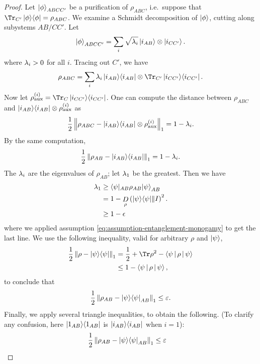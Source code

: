 \begin{appendices}
\begin{proof}
	Let $\ket\phi_{ABCC'}$ be a purification of $\rho_{ABC}$, i.e.\ suppose that $\Tr_{C'} \proj\phi = \rho_{ABC}$. We examine a Schmidt decomposition of $\ket\phi$, cutting along subystems $AB/CC'$. Let
	\begin{equation}
		\ket{\phi}_{ABCC'} = \sum_i \sqrt{\lambda_i} \ket{i_{AB}}\otimes\ket{i_{CC'}}.
	\end{equation}
	where $\lambda_i >0$ for all $i$.
	Tracing out $C'$, we have
	\begin{equation}
		\rho_{ABC} = \sum_i \l_i \proj{i_{AB}}\otimes\Tr_{C'}\proj{i_{CC'}}.
	\end{equation}
	Now let $\rho^{(i)}_{\text{aux}} = \Tr_C\proj{i_{CC'}}$. One can compute the distance between $\rho_{ABC}$ and $\ket{i_{AB}}\!\bra{i_{AB}}\otimes\rho^{(i)}_{\text{aux}}$ as
	\begin{equation}
	\label{eq:entanglement-monogamy-1}
		\frac12\left\Vert\rho_{ABC} - \ket{i_{AB}}\!\bra{i_{AB}}\otimes\rho^{(i)}_{\text{aux}}\right\Vert_1 = 1- \lambda_i.
	\end{equation}
	By the same computation,
	\begin{equation}
	\label{eq:entanglement-monogamy-2}
		\frac 12\left\Vert\rho_{AB} - \ket{i_{AB}}\!\bra{i_{AB}}\right\Vert_1 
		= 1- \lambda_i.
	\end{equation}
	\noindent
	The $\lambda_i$ are the eigenvalues of $\rho_{AB}$; let $\lambda_1$ be the greatest. Then we have
	\begin{align}
		\lambda_1 
		&\geq \braket{\psi|_{AB}\rho_{AB}|\psi}_{AB} 
		\\&= 1 - \mathop{D}\limits_{\rho}\left(\ket{\psi}\!\bra{\psi}\middle\| I\right)^2. 
		\\ &\geq 1-\epsilon
	\end{align}
where we applied assumption \eqref{eq:assumption-entanglement-monogamy} to get the last line. We use the following inequality, valid for arbitrary $\rho$ and $\ket\psi$,
	\begin{align*}
		\frac12 \norm{\rho - \proj \psi}_1 
		& = \frac12 + \Tr\rho^2 - \sandwich\psi\rho
		\\& \leq 1 - \sandwich\psi\rho,
	\end{align*}
	to conclude that 
	\begin{equation}
	\label{eq:entanglement-monogamy-3}
		\frac12\left\Vert\rho_{AB} - \ket{\psi}\!\bra{\psi}_{AB}\right\Vert_1 \leq \varepsilon.
	\end{equation}
	Finally, we apply several triangle inequalities, to obtain the following. (To clarify any confusion, here $\ket{1_{AB}}\!\bra{1_{AB}}$ is $\ket{i_{AB}}\!\bra{i_{AB}}$ when $i = 1$):
	\begin{align}
		\frac12 \norm{\rho_{AB} - \proj\psi_{AB}}_1
		&\leq \e

\end{align}
\end{proof}
\end{appendices}
